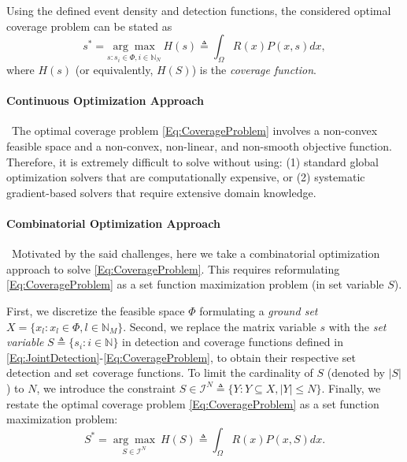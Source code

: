 \documentclass[letterpaper, 10 pt, conference]{ieeeconf}
\newcommand{\N}{\mathbb{N}}
\begin{document}
Using the defined event density and detection functions, the considered optimal coverage problem can be stated as 
\begin{equation}\label{Eq:CoverageProblem}
 s^* = \underset{s:s_i\in \Phi, i\in \N_N}{\arg\max}\ H(s) \triangleq \int_\Omega R(x)P(x,s)dx,  
\end{equation}
where $H(s)$ (or equivalently, $H(S)$) is the \emph{coverage function}.



\paragraph*{Continuous Optimization Approach}\ 
The optimal coverage problem \eqref{Eq:CoverageProblem} involves a non-convex feasible space and a non-convex, non-linear, and non-smooth objective function. Therefore, it is extremely difficult to solve without using: (1) standard global optimization solvers that are computationally expensive, or (2) systematic gradient-based solvers that require extensive domain knowledge. 

\paragraph*{Combinatorial Optimization Approach}\ Motivated by the said challenges, here we take a combinatorial optimization approach to solve \eqref{Eq:CoverageProblem}. This requires reformulating \eqref{Eq:CoverageProblem} as a set function maximization problem (in set variable $S$).


First, we discretize the feasible space $\Phi$ formulating a \emph{ground set} $X = \{x_l:x_l\in \Phi, l\in\N_M\}$. Second, we replace the matrix variable $s$ with the \emph{set variable} $S \triangleq \{s_i:i\in\N\}$ in detection and coverage functions defined in \eqref{Eq:JointDetection}-\eqref{Eq:CoverageProblem}, to obtain their respective set detection and set coverage functions. To limit the cardinality of $S$ (denoted by $\vert S \vert$) to $N$, we introduce the constraint $S \in \mathcal{I}^N \triangleq \{Y: Y \subseteq X, \vert Y \vert \leq N\}$. Finally, we restate the optimal coverage problem \eqref{Eq:CoverageProblem} as a set function maximization problem:
\begin{equation}\label{Eq:SetCoverageProblem}
S^* = \underset{S\in\mathcal{I}^N}{\arg\max}\ H(S) \triangleq \int_\Omega R(x)P(x,S)dx.
\end{equation} 
\end{document}

